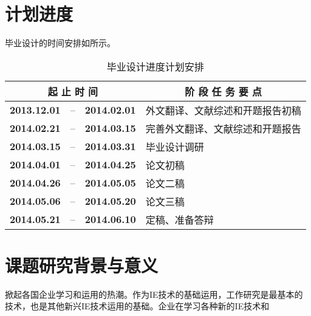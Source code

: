 \chapter{计划进度}
毕业设计的时间安排如所示。

\begin{table}[H]
  \centering\xiaowu
  \caption{毕业设计进度计划安排}
    \begin{tabular}{cccl}
    \toprule
    \multicolumn{3}{c}{\textbf{起 止 时 间}} & \multicolumn{1}{c}{\textbf{阶  段  任  务  要  点}} \\
    \midrule
    \textbf{2013.12.01} & --    & \textbf{2014.02.01} & 外文翻译、文献综述和开题报告初稿 \\
    \textbf{2014.02.21} & --    & \textbf{2014.03.15} & 完善外文翻译、文献综述和开题报告 \\
    \textbf{2014.03.15} & --    & \textbf{2014.03.31} & 毕业设计调研 \\
    \textbf{2014.04.01} & --    & \textbf{2014.04.25} & 论文初稿 \\
    \textbf{2014.04.26} & --    & \textbf{2014.05.05} & 论文二稿 \\
    \textbf{2014.05.06} & --    & \textbf{2014.05.20} & 论文三稿 \\
    \textbf{2014.05.21} & --    & \textbf{2014.06.10} & 定稿、准备答辩 \\
    \bottomrule
    \end{tabular}%
  \label{tab:myschedule}%
\end{table}%


\chapter{课题研究背景与意义}
掀起各国企业学习和运用的热潮。作为IE技术的基础运用，工作研究是最基本的技术，也是其他新兴IE技术运用的基础。企业在学习各种新的IE技术和\cite{2007}